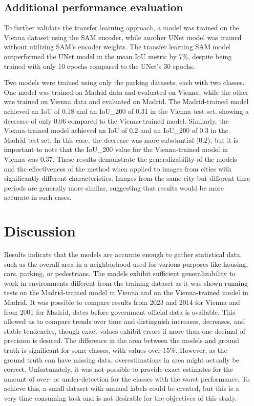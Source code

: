 \begin{refsection}
\subsection{Additional performance evaluation}

To further validate the transfer learning approach, a model was trained on the Vienna dataset using the SAM encoder, while another UNet model was trained without utilizing SAM's encoder weights. The transfer learning SAM model outperformed the UNet model in the mean IoU metric by 7\%, despite being trained with only 10 epochs compared to the UNet's 30 epochs.

Two models were trained using only the parking datasets, each with two classes. One model was trained on Madrid data and evaluated on Vienna, while the other was trained on Vienna data and evaluated on Madrid. The Madrid-trained model achieved an IoU of 0.18 and an IoU\_200 of 0.31 in the Vienna test set, showing a decrease of only 0.06 compared to the Vienna-trained model. Similarly, the Vienna-trained model achieved an IoU of 0.2 and an IoU\_200 of 0.3 in the Madrid test set. In this case, the decrease was more substantial (0.2), but it is important to note that the IoU\_200 value for the Vienna-trained model in Vienna was 0.37. These results demonstrate the generalizability of the models and the effectiveness of the method when applied to images from cities with significantly different characteristics. Images from the same city but different time periods are generally more similar, suggesting that results would be more accurate in such cases.

\renewcommand{\sectionnametext}{Discussion}
\renewcommand{\headingtextR}{\thesection. \sectionnametext}
\section{\sectionnametext}

Results indicate that the models are accurate enough to gather statistical data, such as the overall area in a neighborhood used for various purposes like housing, cars, parking, or pedestrians. The models exhibit sufficient generalizability to work in environments different from the training dataset as it was shown running tests on the Madrid-trained model in Vienna and on the Vienna-trained model in Madrid. It was possible to compare results from 2023 and 2014 for Vienna and from 2001 for Madrid, dates before government official data is available. This allowed us to compare trends over time and distinguish increases, decreases, and stable tendencies, though exact values exhibit errors if more than one decimal of precision is desired. The difference in the area between the models and ground truth is significant for some classes, with values over 15\%. However, as the ground truth can have missing data, overestimations in area might actually be correct. Unfortunately, it was not possible to provide exact estimates for the amount of over- or under-detection for the classes with the worst performance. To achieve this, a small dataset with manual labels could be created, but this is a very time-consuming task and is not desirable for the objectives of this study.



\end{refsection}
